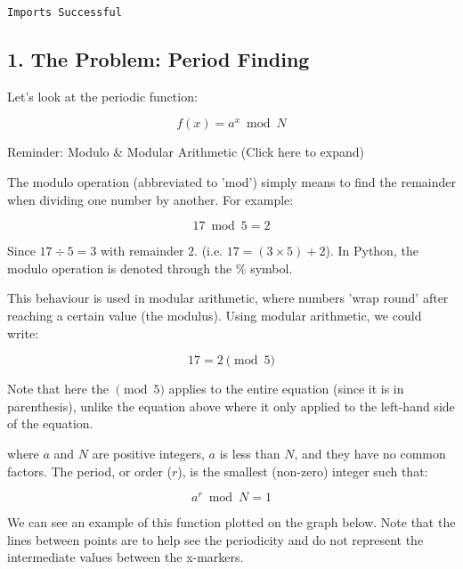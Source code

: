 \documentclass[11pt]{article}
\begin{document}
    \begin{Verbatim}[commandchars=\\\{\}]
Imports Successful
    \end{Verbatim}

    \subsection{1. The Problem: Period
Finding}\label{the-problem-period-finding}

Let's look at the periodic function:

\[ f(x) = a^x \bmod{N}\]

 Reminder: Modulo \& Modular Arithmetic (Click here to expand)

The modulo operation (abbreviated to 'mod') simply means to find the
remainder when dividing one number by another. For example:

\[ 17 \bmod 5 = 2 \]

Since \(17 \div 5 = 3\) with remainder \(2\). (i.e.
\(17 = (3\times 5) + 2\)). In Python, the modulo operation is denoted
through the \% symbol.

This behaviour is used in modular arithmetic, where numbers 'wrap round'
after reaching a certain value (the modulus). Using modular arithmetic,
we could write:

\[ 17 = 2 \pmod 5\]

Note that here the \(\pmod 5\) applies to the entire equation (since it
is in parenthesis), unlike the equation above where it only applied to
the left-hand side of the equation.

where \(a\) and \(N\) are positive integers, \(a\) is less than \(N\),
and they have no common factors. The period, or order (\(r\)), is the
smallest (non-zero) integer such that:

\[a^r \bmod N = 1 \]

We can see an example of this function plotted on the graph below. Note
that the lines between points are to help see the periodicity and do not
represent the intermediate values between the x-markers.
\end{document}
